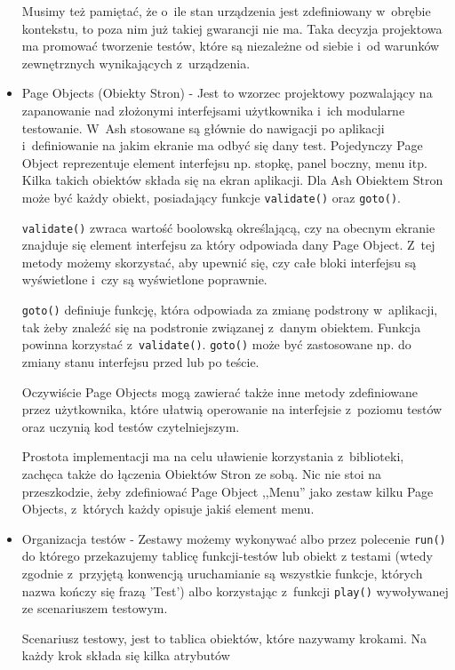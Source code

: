 \documentclass[brudnopis]{xmgr}
\begin{document}
\begin{itemize}
Musimy też pamiętać, że o~ile stan urządzenia jest zdefiniowany w~obrębie kontekstu, to poza nim już takiej gwarancji nie ma. Taka decyzja projektowa ma promować tworzenie testów, które są  niezależne od siebie i~od warunków zewnętrznych wynikających z~urządzenia.

  \item Page Objects (Obiekty Stron) - Jest to wzorzec projektowy pozwalający na zapanowanie nad złożonymi interfejsami użytkownika i~ich modularne testowanie. W~Ash stosowane są głównie do nawigacji po aplikacji i~definiowanie na jakim ekranie ma odbyć się dany test. Pojedynczy Page Object reprezentuje element interfejsu np. stopkę, panel boczny, menu itp. Kilka takich obiektów składa się na ekran aplikacji. Dla Ash Obiektem Stron może być każdy obiekt, posiadający funkcje \texttt{validate()} oraz \texttt{goto()}.

\texttt{validate()} zwraca wartość boolowską określającą, czy na obecnym ekranie znajduje się element interfejsu za który odpowiada dany Page Object. Z~tej metody możemy skorzystać, aby upewnić się, czy całe bloki interfejsu są wyświetlone i~czy są wyświetlone poprawnie.

\texttt{goto()} definiuje funkcję, która odpowiada za zmianę podstrony w~aplikacji, tak żeby znaleźć się na podstronie związanej z~danym obiektem. Funkcja powinna korzystać z~\texttt{validate()}. \texttt{goto()} może być zastosowane np. do zmiany stanu interfejsu przed lub po teście.

Oczywiście Page Objects mogą zawierać także inne metody zdefiniowane przez użytkownika, które ułatwią operowanie na interfejsie z~poziomu testów oraz uczynią kod testów czytelniejszym.

Prostota implementacji ma na celu uławienie korzystania z~biblioteki, zachęca także do łączenia Obiektów Stron ze sobą. Nic nie stoi na przeszkodzie, żeby zdefiniować Page Object ,,Menu'' jako zestaw kilku Page Objects, z~których każdy opisuje jakiś element menu. 

 \item Organizacja testów - Zestawy możemy wykonywać albo przez polecenie \texttt{run()} do którego przekazujemy tablicę funkcji-testów lub obiekt z testami (wtedy zgodnie z~przyjętą konwencją uruchamianie są wszystkie funkcje, których nazwa kończy się frazą 'Test') albo korzystając z~funkcji \texttt{play()} wywoływanej ze scenariuszem testowym.

Scenariusz testowy, jest to tablica obiektów, które nazywamy krokami. Na każdy krok składa się kilka atrybutów


\end{itemize}
\end{document}
